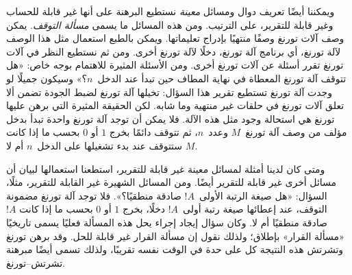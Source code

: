 \documentclass[../../../include/open-logic-section]{subfiles}
\begin{document}
ويمكننا أيضًا تعريف دوال ومسائل \emph{معينة} نستطيع البرهنة على أنها
غير قابلة للحساب وغير قابلة للتقرير، على الترتيب. ومن هذه المسائل ما
يسمى \emph{مسألة التوقف}. يمكن وصف آلات تورنغ وصفًا منتهيًا بإدراج
تعليماتها. ويمكن بالطبع استعمال مثل هذا الوصف لآلة تورنغ، أي برنامج
آلة تورنغ، دخلًا لآلة تورنغ أخرى. ومن ثم نستطيع النظر في آلات تورنغ
تقرر أسئلة عن آلات تورنغ أخرى. ومن الأسئلة المثيرة للاهتمام بوجه خاص:
«هل تتوقف آلة تورنغ المعطاة في نهاية المطاف حين تبدأ عند الدخل~$n$؟»
وسيكون جميلًا لو وجدت آلة تورنغ تستطيع تقرير هذا السؤال: تخيلها آلة
تورنغ لضبط الجودة تضمن ألا تعلق آلات تورنغ في حلقات غير منتهية وما
شابه. لكن الحقيقة المثيرة التي برهن عليها تورنغ هي استحالة وجود مثل
هذه الآلة. فلا يمكن أن توجد آلة تورنغ واحدة تبدأ بدخل مؤلف من وصف آلة
تورنغ~$M$ وعدد~$n$، ثم تتوقف دائمًا بخرج $1$ أو $0$ بحسب ما إذا كانت
$M$ ستتوقف عند بدء تشغيلها على الدخل~$n$ أم لا.

ومتى كان لدينا أمثلة لمسائل معينة غير قابلة للتقرير، استطعنا استعمالها
لبيان أن مسائل أخرى غير قابلة للتقرير أيضًا. ومن المسائل الشهيرة غير
القابلة للتقرير، مثلًا، السؤال: «هل صيغة الرتبة الأولى~$!A$ صادقة
منطقيًا؟». فلا توجد آلة تورنغ مضمونة التوقف، عند إعطائها صيغة رتبة
أولى~$!A$ دخلًا، بخرج $1$ أو $0$ بحسب ما إذا كانت $!A$ صادقة منطقيًا
أم لا. وكان سؤال إيجاد إجراء يحل هذه المسألة فعليًا يسمى تاريخيًا
«مسألة القرار» بإطلاق؛ ولذلك نقول إن مسألة القرار غير قابلة للحل. وقد
برهن تورنغ وتشرتش هذه النتيجة كل على حدة في الوقت نفسه تقريبًا، ولذلك
تسمى أيضًا مبرهنة تشرتش--تورنغ.
\end{document}
